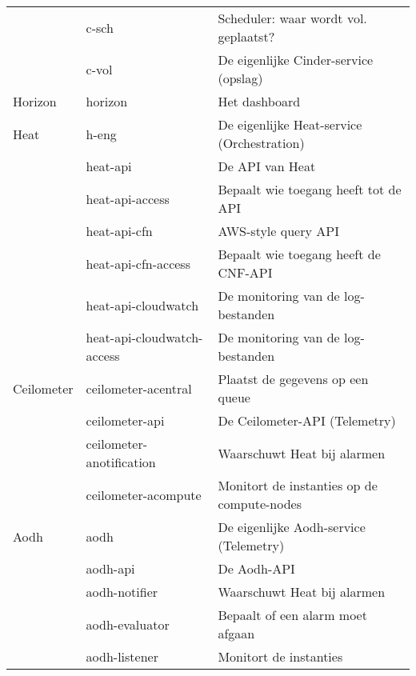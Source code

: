 \begin{appendices}
\begin{table}[H]
\begin{tabular}{lll}
 		& c-sch                      & Scheduler: waar wordt vol. geplaatst?              \\
 		& c-vol                      & De eigenlijke Cinder-service (opslag)              \\ \hline
 		Horizon    & horizon                    & Het dashboard                                      \\ \hline
 		Heat       & h-eng                      & De eigenlijke Heat-service (Orchestration)         \\
 		& heat-api                   & De API van Heat                                    \\
 		& heat-api-access            & Bepaalt wie toegang heeft tot de API               \\
 		& heat-api-cfn               & AWS-style query API                                \\
 		& heat-api-cfn-access        & Bepaalt wie toegang heeft de CNF-API               \\
 		& heat-api-cloudwatch        & De monitoring van de log-bestanden                 \\
 		& heat-api-cloudwatch-access & De monitoring van de log-bestanden                 \\ \hline
 		Ceilometer & ceilometer-acentral        & Plaatst de gegevens op een queue                   \\
 		& ceilometer-api             & De Ceilometer-API (Telemetry)                      \\
 		& ceilometer-anotification   & Waarschuwt Heat bij alarmen                        \\
 		& ceilometer-acompute        & Monitort de instanties op de compute-nodes         \\ \hline
 		Aodh       & aodh                       & De eigenlijke Aodh-service (Telemetry)             \\
 		& aodh-api                   & De Aodh-API                                        \\
 		& aodh-notifier              & Waarschuwt Heat bij alarmen                        \\
 		& aodh-evaluator             & Bepaalt of een alarm moet afgaan                   \\
 		& aodh-listener              & Monitort de instanties                             \\ \hline
 	\end{tabular}
 \end{table}
 

\end{appendices}
